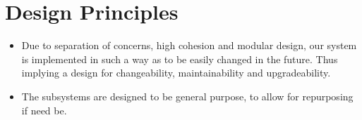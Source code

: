 \documentclass[a4paper,11pt]{book}
\begin{document}
\section{Design Principles}

\begin{itemize}
	\item Due to separation of concerns, high cohesion and modular design, our system is implemented in such a way as to be easily changed in the future.
	Thus implying a design for changeability, maintainability and upgradeability.
	\item The subsystems are designed to be general purpose, to allow for repurposing if need be. 
\end{itemize}
\end{document}

